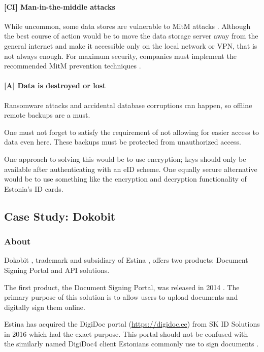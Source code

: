 \paragraph{[CI] Man-in-the-middle attacks} While uncommon, some data stores are vulnerable to MitM attacks \cite{sql-server-auth-mitm}. Although the best course of action would be to move the data storage server away from the general internet and make it accessible only on the local network or VPN, that is not always enough. For maximum security, companies must implement the recommended MitM prevention techniques \cite{sql-server-enable-tls}.

\paragraph{[A] Data is destroyed or lost}

Ransomware attacks and accidental database corruptions can happen, so offline remote backups are a must.

One must not forget to satisfy the requirement of not allowing for easier access to data even here. These backups must be protected from unauthorized access.

One approach to solving this would be to use encryption; keys should only be available after authenticating with an eID scheme. One equally secure alternative would be to use something like the encryption and decryption functionality of Estonia's ID cards.

\subsection{Case Study: Dokobit}

\subsubsection{About}

Dokobit \cite{dokobit}, trademark and subsidiary of Estina \cite{euipo-dokobit}, offers two products: Document Signing Portal and API solutions.

The first product, the Document Signing Portal, was released in 2014 \cite{dokobit-aboutus}. The primary purpose of this solution is to allow users to upload documents and digitally sign them online.

Estina has acquired the DigiDoc portal (\url{https://digidoc.ee}) from SK ID Solutions in 2016 \cite{sk-digidocacquired} which had the exact purpose. This portal should not be confused with the similarly named DigiDoc4 client Estonians commonly use to sign documents \cite{ria-idee}.

